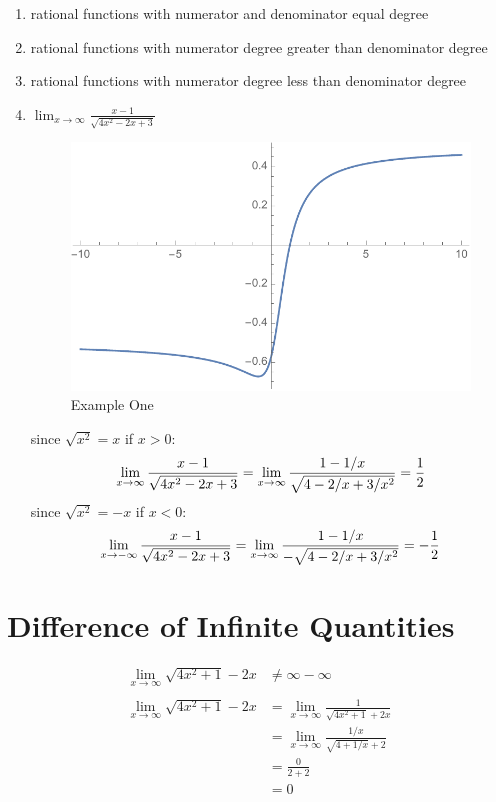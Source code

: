 \documentclass[letterpaper, landscape]{exam}
\begin{document}
  \begin{enumerate}
    \item rational functions with numerator and denominator equal degree
    \item rational functions with numerator degree greater than denominator degree
    \item rational functions with numerator degree less than denominator degree

    \item $\lim_{x \to \infty} \frac{x - 1}{\sqrt{4x^2 - 2x + 3}}$

      \begin{figure}[H]
        \centering
        \includegraphics[scale = 0.5]{example01.pdf}
        \caption{Example One}
        \label{fig:example01}
      \end{figure}

      since $\sqrt{x^2} = x$ if $x > 0$:
      \[
        \lim_{x \to \infty} \frac{x - 1}{\sqrt{4x^2 - 2x + 3}} 
          = \lim_{x \to \infty} \frac{1 - 1/x}{\sqrt{4 - 2/x + 3/x^2}} 
          = \frac{1}{2} \\
      \]
      since $\sqrt{x^2} = -x$ if $x < 0$:
      \[
        \lim_{x \to -\infty} \frac{x - 1}{\sqrt{4x^2 - 2x + 3}} 
          = \lim_{x \to \infty} \frac{1 - 1/x}{-\sqrt{4 - 2/x + 3/x^2}} 
          = -\frac{1}{2} \\
      \]
  \end{enumerate}

  \section{Difference of Infinite Quantities}

  \begin{align*}
    \lim_{x \to \infty} \sqrt{4x^2 + 1} - 2x & \neq \infty - \infty \\
    \\
    \lim_{x \to \infty} \sqrt{4x^2 + 1} - 2x & = \lim_{x \to \infty} \frac{1}{\sqrt{4x^2 + 1} + 2x} \\
      & = \lim_{x \to \infty} \frac{1/x}{\sqrt{4 + 1/x} + 2} \\
      & = \frac{0}{2 + 2} \\
      & = \boxed{ 0 } \\
  \end{align*}
\end{document}
